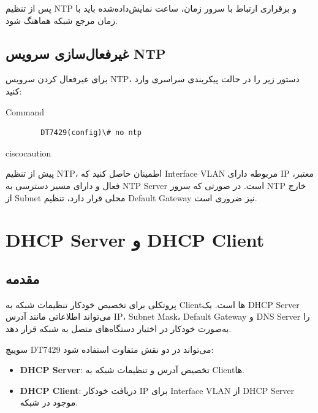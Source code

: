 \documentclass[11pt,letterpaper]{report}
\newenvironment{cautionbox}[1]{%
	\begin{noticebox}[title={\textbf{\faExclamationTriangle\ #1}}]{ciscocaution}
	}{%
	\end{noticebox}
}
\begin{document}
	پس از تنظیم NTP و برقراری ارتباط با سرور زمان، ساعت نمایش‌داده‌شده
	باید با زمان مرجع شبکه هماهنگ شود.


	\section{غیرفعال‌سازی سرویس NTP}

	برای غیرفعال کردن سرویس NTP، دستور زیر را در حالت پیکربندی سراسری
	وارد کنید:

	\begin{latin}
		\begin{cliexample}{Command}
			\begin{verbatim}
		DT7429(config)\# no ntp
			\end{verbatim}
		\end{cliexample}
	\end{latin}

	\begin{cautionbox}{هشدار}
		پیش از تنظیم NTP، اطمینان حاصل کنید که Interface VLAN مربوطه دارای
		IP معتبر، فعال و دارای مسیر دسترسی به NTP Server است. در صورتی که
		سرور NTP خارج از Subnet محلی قرار دارد، تنظیم Default Gateway نیز
		ضروری است.
	\end{cautionbox}



	\chapter{DHCP Server و DHCP Client}

	\section{مقدمه}

	 پروتکلی برای تخصیص
	خودکار تنظیمات شبکه به Clientها است. یک DHCP Server می‌تواند اطلاعاتی
	مانند آدرس IP، Subnet Mask، Default Gateway و DNS Server را به‌صورت
	خودکار در اختیار دستگاه‌های متصل به شبکه قرار دهد.

	سوییچ DT7429 می‌تواند در دو نقش متفاوت استفاده شود:

	\begin{itemize}
		\item \textbf{DHCP Server}: تخصیص آدرس و تنظیمات شبکه به Clientها.
		\item \textbf{DHCP Client}: دریافت خودکار IP برای Interface VLAN از DHCP Server موجود در شبکه.
	\end{itemize}
\end{document}
